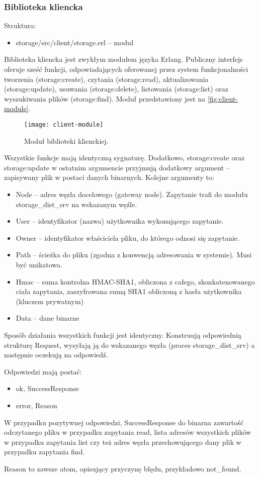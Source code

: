 \subsubsection{Biblioteka kliencka}
Struktura:
\begin{itemize}
	\item storage/src/client/storage.erl – moduł
\end{itemize}

Biblioteka kliencka jest zwykłym modułem języka Erlang. Publiczny interfejs oferuje sześć funkcji, odpowiadających oferowanej przez system funkcjonalności tworzenia (storage:create), czytania (storage:read), aktualizowania (storage:update), usuwania (storage:delete), listowania (storage:list) oraz wyszukiwania plików (storage:find). Moduł przedstawiony jest na \autoref{fig:client-module}.

\begin{figure}[!htbp]
	\centering
	\texttt{[image: client-module]}
	\caption{Moduł biblioteki klienckiej.}
	\label{fig:client-module}
\end{figure}

Wszystkie funkcje mają identyczną sygnaturę. Dodatkowo, storage:create oraz storage:update w ostatnim argumencie przyjmują dodatkowy argument – zapisywany plik w postaci danych binarnych. Kolejne argumenty to:
\begin{itemize}
	\item Node – adres węzła docelowego (gateway node). Zapytanie trafi do modułu storage\_dist\_srv na wskazanym węźle.
	\item User – identyfikator (nazwa) użytkownika wykonującego zapytanie.
	\item Owner – identyfikator właściciela pliku, do którego odnosi się zapytanie.
	\item Path – ścieżka do pliku (zgodna z konwencją adresowania w systemie). Musi być unikatowa.
	\item Hmac – suma kontrolna HMAC-SHA1, obliczona z całego, skonkatenowanego ciała zapytania, zaszyfrowana sumą SHA1 obliczoną z hasła użytkownika (kluczem prywatnym)
	\item Data – dane binarne
\end{itemize}

Sposób działania wszystkich funkcji jest identyczny. Konstruują odpowiednią strukturę Request, wysyłają ją do wskazanego węzła (proces storage\_dist\_srv) a następnie oczekują na odpowiedź.

Odpowiedzi mają postać:
\begin{itemize}
	\item {ok, SuccessResponse}
	\item {error, Reason}
\end{itemize}

W przypadku pozytywnej odpowiedzi, SuccessResponse do binarna zawartość odczytanego pliku w przypadku zapytania read, lista adresów wszystkich plików w przypadku zapytania list czy też adres węzła przechowującego dany plik w przypadku zapytania find.

Reason to zawsze atom, opisujący przyczynę błędu, przykładowo not\_found.